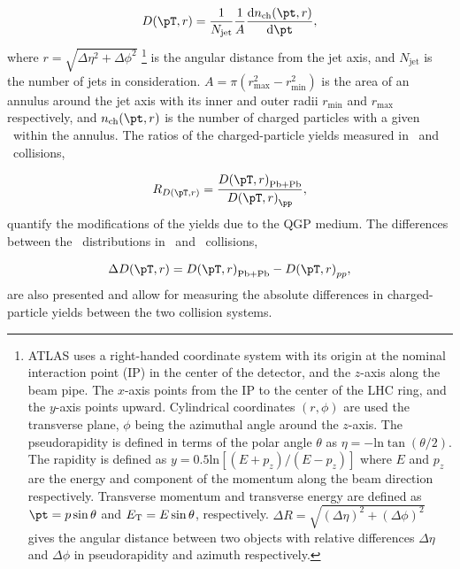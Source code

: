 \begin{align*}
\Dptr = \frac{1}{N_{\mathrm{jet}}} \frac{1}{A} \frac{\mathrm{d} n_{\mathrm{ch}} (\pt, r)}{\mathrm{d} \pt},
\end{align*}
where $r = \sqrt{\Delta \eta^2 + \Delta \phi^2}$ \footnote{ATLAS uses a right-handed coordinate system with its origin at the nominal interaction point (IP) in the center of the detector, and the $z$-axis along the beam pipe. The $x$-axis points from the IP to the center of the LHC ring, and the $y$-axis points upward. Cylindrical coordinates $(r, \phi)$ are used the transverse plane, $\phi$ being the azimuthal angle around the $z$-axis. The pseudorapidity is defined in terms of the polar angle $\theta$ as $\eta = - \text{ln} \tan (\theta/2)$. The rapidity is defined as $y = 0.5\text{ln}[(E + p_z)/(E-p_z)]$ where $E$ and $p_z$ are the energy and component of the momentum along the beam direction respectively. Transverse momentum and transverse energy are defined as $\pt = p \sin\theta$ and $\mbox{$E_{\mathrm{T}}$} = E \sin\theta$, respectively. $\Delta R = \sqrt{(\Delta \eta )^2 + (\Delta \phi)^2}$ gives the angular distance between two objects with relative differences $\Delta \eta$ and $\Delta \phi$ in pseudorapidity and azimuth respectively.} is the angular distance from the jet axis, and $N_{\mathrm{jet}}$ is the number of jets in consideration. $A = \pi (r_{\mathrm{max}}^2 - r_{\mathrm{min}}^2) $ is the area of an annulus around the jet axis with its inner and outer radii $r_{\mathrm{min}}$ and $r_{\mathrm{max}}$ respectively, and $n_{\mathrm{ch}}(\pt, r)$ is the number of charged particles with a given \pt\ within the annulus. The ratios of the charged-particle yields measured in \pbpb\ and \pp\ collisions,

\begin{align*}
   \RDptr = \frac{\Dptr_\mathrm{Pb+Pb}}{\Dptr_{\pp}},
\end{align*}
quantify the modifications of the yields due to the QGP medium. The differences between the \Dptr\ distributions in \pbpb\ and \pp\ collisions, 

\begin{align*}
   \Delta \Dptr = \Dptr_\mathrm{Pb+Pb} - \Dptr_{pp},
\end{align*}
are also presented and allow for measuring the absolute differences in charged-particle yields between the two collision systems. 


